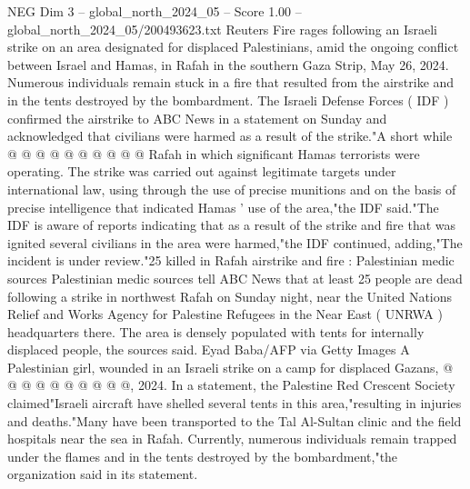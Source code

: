 \begin{textsample}{NEG Dim 3 – global\_north\_2024\_05 – Score 1.00 – global\_north\_2024\_05/200493623.txt}
Reuters Fire rages following an Israeli strike on an area designated for displaced Palestinians, amid the ongoing conflict between Israel and Hamas, in Rafah in the southern Gaza Strip, May 26, 2024.
Numerous individuals remain stuck in a fire that resulted from the airstrike and in the tents destroyed by the bombardment.
The Israeli Defense Forces ( IDF ) confirmed the airstrike to ABC News in a statement on Sunday and acknowledged that civilians were harmed as a result of the strike."A short while @ @ @ @ @ @ @ @ @ @ Rafah in which significant Hamas terrorists were operating.
The strike was carried out against legitimate targets under international law, using through the use of precise munitions and on the basis of precise intelligence that indicated Hamas ' use of the area,"the IDF said."The IDF is aware of reports indicating that as a result of the strike and fire that was ignited several civilians in the area were harmed,"the IDF continued, adding,"The incident is under review."25 killed in Rafah airstrike and fire : Palestinian medic sources Palestinian medic sources tell ABC News that at least 25 people are dead following a strike in northwest Rafah on Sunday night, near the United Nations Relief and Works Agency for Palestine Refugees in the Near East ( UNRWA ) headquarters there.
The area is densely populated with tents for internally displaced people, the sources said.
Eyad Baba/AFP via Getty Images A Palestinian girl, wounded in an Israeli strike on a camp for displaced Gazans, @ @ @ @ @ @ @ @ @ @, 2024.
In a statement, the Palestine Red Crescent Society claimed"Israeli aircraft have shelled several tents in this area,"resulting in injuries and deaths."Many have been transported to the Tal Al-Sultan clinic and the field hospitals near the sea in Rafah.
Currently, numerous individuals remain trapped under the flames and in the tents destroyed by the bombardment,"the organization said in its statement.

\end{textsample}
